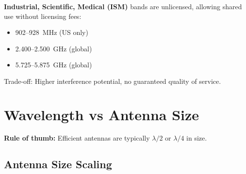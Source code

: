 \textbf{Industrial, Scientific, Medical (ISM)} bands are unlicensed, allowing shared use without licensing fees:

\begin{itemize}
\item 902--928~MHz (US only)
\item 2.400--2.500~GHz (global)
\item 5.725--5.875~GHz (global)
\end{itemize}

Trade-off: Higher interference potential, no guaranteed quality of service.

\section{Wavelength vs Antenna Size}

\textbf{Rule of thumb:} Efficient antennas are typically $\lambda/2$ or $\lambda/4$ in size.

\subsection{Antenna Size Scaling}

